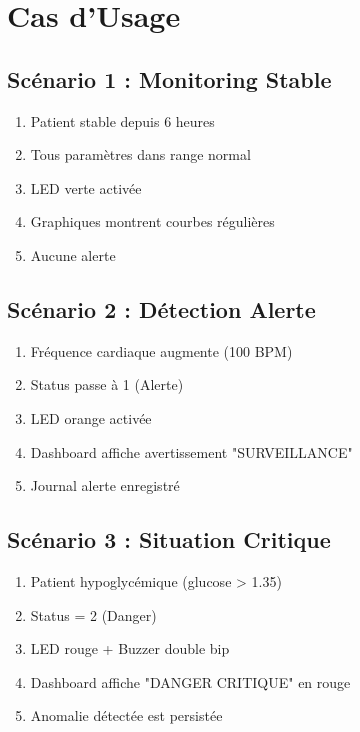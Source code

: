 \documentclass[12pt,french]{report}
\begin{document}
\section{Cas d'Usage}

\subsection{Scénario 1 : Monitoring Stable}

\begin{enumerate}
    \item Patient stable depuis 6 heures
    \item Tous paramètres dans range normal
    \item LED verte activée
    \item Graphiques montrent courbes régulières
    \item Aucune alerte
\end{enumerate}

\subsection{Scénario 2 : Détection Alerte}

\begin{enumerate}
    \item Fréquence cardiaque augmente (100 BPM)
    \item Status passe à 1 (Alerte)
    \item LED orange activée
    \item Dashboard affiche avertissement "SURVEILLANCE"
    \item Journal alerte enregistré
\end{enumerate}

\subsection{Scénario 3 : Situation Critique}

\begin{enumerate}
    \item Patient hypoglycémique (glucose > 1.35)
    \item Status = 2 (Danger)
    \item LED rouge + Buzzer double bip
    \item Dashboard affiche "DANGER CRITIQUE" en rouge
    \item Anomalie détectée est persistée
\end{enumerate}
\end{document}
